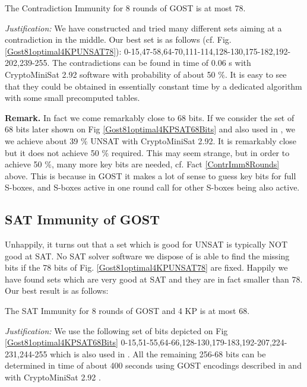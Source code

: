 \begin{fact}
	\label{ContrImm8Rounds}
	The Contradiction Immunity
	for 8 rounds of GOST is at most 78.
\end{fact}

\noindent\emph{Justification:}
We have constructed and tried many different sets aiming at a contradiction in the middle.
Our best set is as follows (cf. Fig. \ref{Gost81optimal4KPUNSAT78}):
0-15,47-58,64-70,111-114,128-130,175-182,192-202,239-255.
The contradictions can be found in time of 0.06 s
with CryptoMiniSat 2.92 software \cite{CryptoMiniSat}
with probability of about 50 $\%$.
It is easy to see that they could be obtained in essentially constant time
by a dedicated algorithm with some small precomputed tables.

{\bf Remark.}
In fact we come remarkably close to 68 bits.
If we consider the set of 68 bits
later shown on Fig \ref{Gost81optimal4KPSAT68Bits}
and also used in \cite{gostlow8r},
we we achieve about 39 $\%$ UNSAT with CryptoMiniSat 2.92.
It is remarkably close but it does not achieve 50 $\%$ required.
This may seem strange, but in order to achieve 50 $\%$,
many more key bits are needed, cf. Fact \ref{ContrImm8Rounds} above.
This is because in GOST it makes a lot of sense to guess key bits
for full S-boxes, and S-boxes active in one round
call for other S-boxes being also active.

\subsection{SAT Immunity of GOST}
Unhappily, it turns out that a set which is good for UNSAT is
typically NOT good at SAT.
No SAT solver software we dispose of is able to find the missing
bits if the 78 bits of Fig. \ref{Gost81optimal4KPUNSAT78} are fixed.
Happily we have found sets which are very good at SAT
and they are in fact smaller than 78.
Our best result is as follows:


\begin{fact}
	\label{SATImm8Rounds}
	The SAT Immunity
	for 8 rounds of GOST and 4 KP
	is at most 68.
\end{fact}


\noindent\emph{Justification:}
We use the following set of bits
depicted on Fig \ref{Gost81optimal4KPSAT68Bits}
0-15,51-55,64-66,128-130,179-183,192-207,224-231,244-255
which is also used in \cite{gostlow8r}.
All the remaining 256-68 bits can be determined in time of
about 400 seconds
using GOST encodings described in \cite{optisharcs}
and with CryptoMiniSat 2.92 \cite{CryptoMiniSat}.

